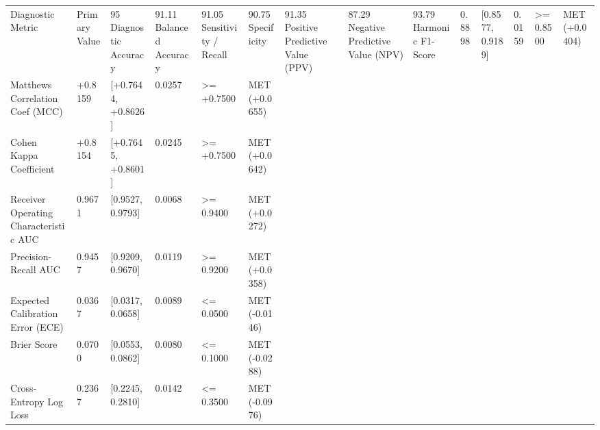 \begin{tabular}{llllll}
\toprule
Diagnostic Metric & Primary Value & 95%
\midrule
Diagnostic Accuracy & 91.11%
Balanced Accuracy & 91.05%
Sensitivity / Recall & 90.75%
Specificity & 91.35%
Positive Predictive Value (PPV) & 87.29%
Negative Predictive Value (NPV) & 93.79%
Harmonic F1-Score & 0.8898 & [0.8577, 0.9189] & 0.0159 & >= 0.8500 & MET (+0.0404) \\
Matthews Correlation Coef (MCC) & +0.8159 & [+0.7644, +0.8626] & 0.0257 & >= +0.7500 & MET (+0.0655) \\
Cohen Kappa Coefficient & +0.8154 & [+0.7645, +0.8601] & 0.0245 & >= +0.7500 & MET (+0.0642) \\
Receiver Operating Characteristic AUC & 0.9671 & [0.9527, 0.9793] & 0.0068 & >= 0.9400 & MET (+0.0272) \\
Precision-Recall AUC & 0.9457 & [0.9209, 0.9670] & 0.0119 & >= 0.9200 & MET (+0.0358) \\
Expected Calibration Error (ECE) & 0.0367 & [0.0317, 0.0658] & 0.0089 & <= 0.0500 & MET (-0.0146) \\
Brier Score & 0.0700 & [0.0553, 0.0862] & 0.0080 & <= 0.1000 & MET (-0.0288) \\
Cross-Entropy Log Loss & 0.2367 & [0.2245, 0.2810] & 0.0142 & <= 0.3500 & MET (-0.0976) \\
\bottomrule
\end{tabular}
